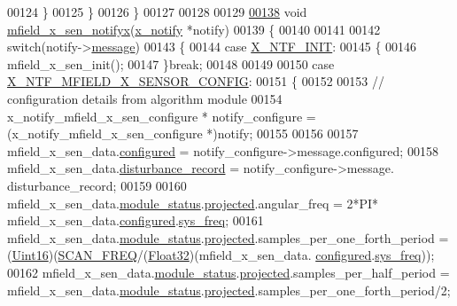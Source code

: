 \begin{DoxyCode}
00124         \}
00125     \}
00126 \}
00127 
00128 
00129 
\hypertarget{a00052_source_l00138}{}\hyperlink{a00052_ac28a2b5f3fa92c0593446e15a63a501c}{00138} \textcolor{keywordtype}{void} \hyperlink{a00052_ac28a2b5f3fa92c0593446e15a63a501c}{mfield\_x\_sen\_notifyx}(\hyperlink{a00036_df/d4c/a00851}{x\_notify} *notify)
00139 \{
00140 
00141 
00142     \textcolor{keywordflow}{switch}(notify->\hyperlink{a00036_adf9665938515a20c283eea2c978cf80d}{message})
00143     \{
00144         \textcolor{keywordflow}{case} \hyperlink{a00036_a620b808f2d7b8d2a03c4d026a4c5423c}{X\_NTF\_INIT}:
00145         \{
00146             mfield\_x\_sen\_init();
00147         \}\textcolor{keywordflow}{break};
00148 
00149 
00150         \textcolor{keywordflow}{case} \hyperlink{a00019_aa16cf9dd51c7cbef48581b7862153ced}{X\_NTF\_MFIELD\_X\_SENSOR\_CONFIG}:
00151         \{
00152 
00153             \textcolor{comment}{// configuration details from algorithm module}
00154             x\_notify\_mfield\_x\_sen\_configure * notify\_configure = (x\_notify\_mfield\_x\_sen\_configure *)notify;
00155 
00156 
00157             mfield\_x\_sen\_data.\hyperlink{a00025_a94b2d1f6ea4ab334c74d24984dd27843}{configured} = notify\_configure->message.configured;
00158             mfield\_x\_sen\_data.\hyperlink{a00025_ac9b38e2c1d3f1013a88d33506c754152}{disturbance\_record} = notify\_configure->message.
      disturbance\_record;
00159 
00160            mfield\_x\_sen\_data.\hyperlink{a00025_adfab5a5d8b45a93dfb13edb24e2b80e3}{module\_status}.\hyperlink{a00019_af2267fb093fb5dcaa006a570a6da3b6b}{projected}.angular\_freq             = 2*PI*
      mfield\_x\_sen\_data.\hyperlink{a00025_a94b2d1f6ea4ab334c74d24984dd27843}{configured}.\hyperlink{a00021_aa57be45aa1320405a885474010159c9e}{sys\_freq};
00161            mfield\_x\_sen\_data.\hyperlink{a00025_adfab5a5d8b45a93dfb13edb24e2b80e3}{module\_status}.\hyperlink{a00019_af2267fb093fb5dcaa006a570a6da3b6b}{projected}.samples\_per\_one\_forth\_period    
         = (\hyperlink{a00072_a59a9f6be4562c327cbfb4f7e8e18f08b}{Uint16})(\hyperlink{a00021_a8127170b687c1f67a968886c128e76e4}{SCAN\_FREQ}/(\hyperlink{a00072_a87d38f886e617ced2698fc55afa07637}{Float32})(mfield\_x\_sen\_data.
      \hyperlink{a00025_a94b2d1f6ea4ab334c74d24984dd27843}{configured}.\hyperlink{a00021_aa57be45aa1320405a885474010159c9e}{sys\_freq}));
00162            mfield\_x\_sen\_data.\hyperlink{a00025_adfab5a5d8b45a93dfb13edb24e2b80e3}{module\_status}.\hyperlink{a00019_af2267fb093fb5dcaa006a570a6da3b6b}{projected}.samples\_per\_half\_period  = 
      mfield\_x\_sen\_data.\hyperlink{a00025_adfab5a5d8b45a93dfb13edb24e2b80e3}{module\_status}.\hyperlink{a00019_af2267fb093fb5dcaa006a570a6da3b6b}{projected}.samples\_per\_one\_forth\_period/2;

\end{DoxyCode}
